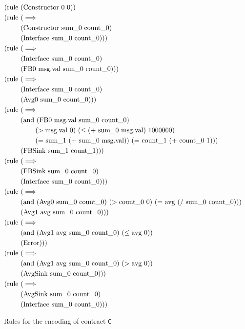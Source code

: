 \begin{figure}[ht]
	\centering
	\begin{align*}
	(\text{rule } & (\text{Constructor 0 0}))
    \\
    (\text{rule } & (\implies \\
    & (\text{Constructor sum\_0 count\_0}) \\ 
    & (\text{Interface sum\_0 count\_0})))
    \\
    (\text{rule } & (\implies \\
    & (\text{Interface sum\_0 count\_0}) \\ 
    & (\text{FB0 msg.val sum\_0 count\_0})))
    \\
    (\text{rule } & (\implies \\
    & (\text{Interface sum\_0 count\_0}) \\ 
    & (\text{Avg0 sum\_0 count\_0})))
    \\
	(\text{rule } & (\implies \\
    & (\text{and } (\text{FB0 msg.val sum\_0 count\_0}) \\
    & \hspace{0.76cm} (>\text{msg.val 0}) \ (\leq\text{(+ sum\_0 msg.val) 1000000}) \\
    & \hspace{0.76cm} (\text{= sum\_1 (+ sum\_0 msg.val)}) \ (\text{= count\_1 (+ count\_0 1}))) \\ 
    & (\text{FBSink sum\_1 count\_1})))
    \\
    (\text{rule } & (\implies \\
    & (\text{FBSink sum\_0 count\_0}) \\ 
    & (\text{Interface sum\_0 count\_0})))
    \\
    (\text{rule } & (\implies \\
    & (\text{and } (\text{Avg0 sum\_0 count\_0}) \ (>\text{count\_0 0}) \ (\text{= avg (/ sum\_0 count\_0)})) \\ 
    & (\text{Avg1 avg sum\_0 count\_0})))
    \\
    (\text{rule } & (\implies \\
    & (\text{and } (\text{Avg1 avg sum\_0 count\_0}) \ (\leq\text{avg 0})) \\ 
    & (\text{Error})))
    \\
    (\text{rule } & (\implies \\
    & (\text{and } (\text{Avg1 avg sum\_0 count\_0}) \ (>\text{avg 0})) \\ 
    & (\text{AvgSink sum\_0 count\_0})))
    \\
    (\text{rule } & (\implies \\
    & (\text{AvgSink sum\_0 count\_0}) \\ 
    & (\text{Interface sum\_0 count\_0})))
    \end{align*}
	\caption{Rules for the encoding of contract \texttt{C}}
	\label{fig:chc_rules}
\end{figure}

